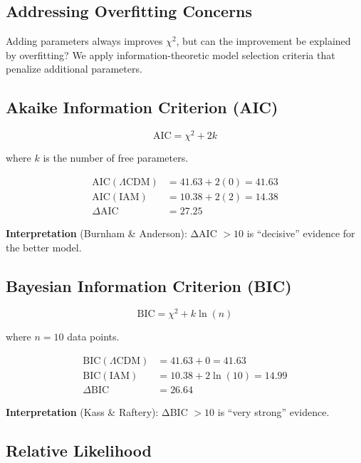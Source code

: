 \documentclass[twocolumn,superscriptaddress,prl,amsmath,amssymb]{revtex4-2}
\begin{document}
\subsection{Addressing Overfitting Concerns}

Adding parameters always improves $\chi^2$, but can the improvement be explained by overfitting? We apply information-theoretic model selection criteria that penalize additional parameters.

\subsection{Akaike Information Criterion (AIC)}

\begin{equation}
\text{AIC} = \chi^2 + 2k
\end{equation}

where $k$ is the number of free parameters.

\begin{align}
\text{AIC}(\Lambda\text{CDM}) &= 41.63 + 2(0) = 41.63 \nonumber\\
\text{AIC}(\text{IAM}) &= 10.38 + 2(2) = 14.38 \nonumber\\
\Delta\text{AIC} &= 27.25
\end{align}

\textbf{Interpretation} (Burnham \& Anderson): ΔAIC $> 10$ is ``decisive'' evidence for the better model.

\subsection{Bayesian Information Criterion (BIC)}

\begin{equation}
\text{BIC} = \chi^2 + k \ln(n)
\end{equation}

where $n = 10$ data points.

\begin{align}
\text{BIC}(\Lambda\text{CDM}) &= 41.63 + 0 = 41.63 \nonumber\\
\text{BIC}(\text{IAM}) &= 10.38 + 2\ln(10) = 14.99 \nonumber\\
\Delta\text{BIC} &= 26.64
\end{align}

\textbf{Interpretation} (Kass \& Raftery): ΔBIC $> 10$ is ``very strong'' evidence.

\subsection{Relative Likelihood}
\end{document}
